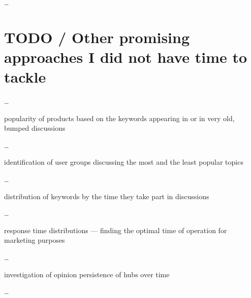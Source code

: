       \ldots

    \section{TODO / Other promising approaches I did not have time to tackle}
    
      \ldots
      
      popularity of products based on the keywords appearing in  or in very old, bumped discussions
      
      \ldots
      
      identification of user groups discussing the most and the least popular topics
      
      \ldots
      
      distribution of keywords by the time they take part in discussions
      
      \ldots
      
      response time distributions --- finding the optimal time of operation for marketing purposes
      
      \ldots
      
      investigation of opinion persistence of hubs over time
      
      \ldots